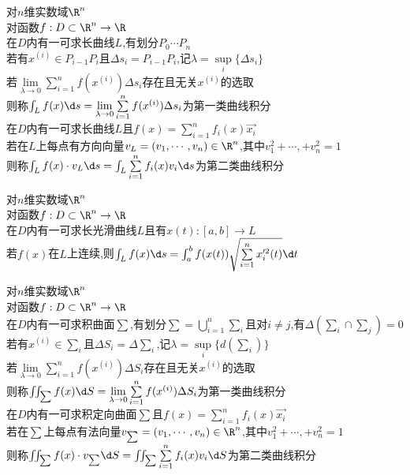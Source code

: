 \begin{dingyi}
对$n$维实数域$\R^n$\\
对函数$f:D\subset \R^n \to \R$\\
在$D$内有一可求长曲线$L$,有划分$P_0\cdots P_n$\\
若有$x^{(i)}\in P_{i-1}P_{i}$且$\Delta s_i=P_{i-1}P_{i}$,记$\lambda=\sup\limits_{i}\{\Delta s_{i}\}$\\
若$\lim\limits_{\lambda\to 0}\sum\limits_{i=1}^{n}f(x^{(i)})\Delta s_i$存在且无关$x^{(i)}$的选取\\
则称$\int_{L}f(x)\d s=\lim\limits_{\lambda\to 0}\sum\limits_{i=1}^{n}f(x^{(i)})\Delta s_i$为第一类曲线积分\\
在$D$内有一可求长曲线$L$且$f(x)=\sum\limits_{i=1}^{n}f_i(x)\vec{x_i}$\\
若在$L$上每点有方向向量$v_{L}=(v_1,\cdots,v_n)\in\R^n$,其中$v_1^2+\cdots,+v_n^2=1$\\
则称$\int_{L}f(x)\cdot v_{L}\d s=\int_{L}\sum\limits_{i=1}^{n}f_{i}(x)v_i\d s$为第二类曲线积分
\end{dingyi}

\begin{dingli}
对$n$维实数域$\R^n$\\
对函数$f:D\subset \R^n \to \R$\\
在$D$内有一可求长光滑曲线$L$且有$x(t):[a,b]\to L$\\
若$f(x)$在$L$上连续,则$\int_{L}f(x)\d s=\int_{a}^{b}f(x(t))\sqrt{\sum\limits_{i=1}^{n}x_i'^2(t)}\d t$
\end{dingli}

\begin{dingyi}
对$n$维实数域$\R^n$\\
对函数$f:D\subset \R^n \to \R$\\
在$D$内有一可求积曲面$\sum$,有划分$\sum=\bigcup\limits_{i=1}^{n}\sum_{i}$且对$i\neq j$,有$\Delta (\sum_i\cap \sum_j)=0$\\
若有$x^{(i)}\in \sum_{i}$且$\Delta S_i=\Delta\sum_i$,记$\lambda=\sup\limits_{i}\{d(\sum_i)\}$\\
若$\lim\limits_{\lambda\to 0}\sum\limits_{i=1}^{n}f(x^{(i)})\Delta S_i$存在且无关$x^{(i)}$的选取\\
则称$\iint_{\sum}f(x)\d S=\lim\limits_{\lambda\to 0}\sum\limits_{i=1}^{n}f(x^{(i)})\Delta S_i$为第一类曲线积分\\
在$D$内有一可求积定向曲面$\sum$且$f(x)=\sum\limits_{i=1}^{n}f_i(x)\vec{x_i}$\\
若在$\sum$上每点有法向量$v_{\sum}=(v_1,\cdots,v_n)\in\R^n$,其中$v_1^2+\cdots,+v_n^2=1$\\
则称$\iint_{\sum}f(x)\cdot v_{\sum}\d S=\iint_{\sum}\sum\limits_{i=1}^{n}f_{i}(x)v_i\d S$为第二类曲线积分
\end{dingyi}

